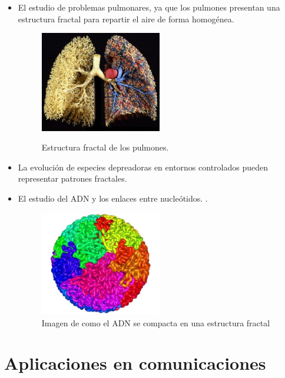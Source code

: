 \begin{itemize}
    \item El estudio de problemas pulmonares, ya que los pulmones presentan una estructura fractal para repartir el aire de forma homogénea.
    
    \begin{figure}[H]
        \centering
        \includegraphics[width=0.5\textwidth]{figures/lungs-fractal.jpg}
        \caption{Estructura fractal de los pulmones.} \cite{BBVA-2020}
        \label{fig:lungs}
    \end{figure}

    \item La evolución de especies depreadoras en entornos controlados pueden representar patrones fractales. \cite{fractales-img}
    
    \item El estudio del ADN y los enlaces entre nucleótidos. \cite{ADN}.
    
    \begin{figure}[H]
        \centering
        \includegraphics[width=0.5\textwidth]{figures/fractal-genome.jpg}
        \caption{Imagen de como el ADN se compacta en una estructura fractal}
        \label{fig:fractal-genome}
    \end{figure}
\end{itemize}

\section{Aplicaciones en comunicaciones}

